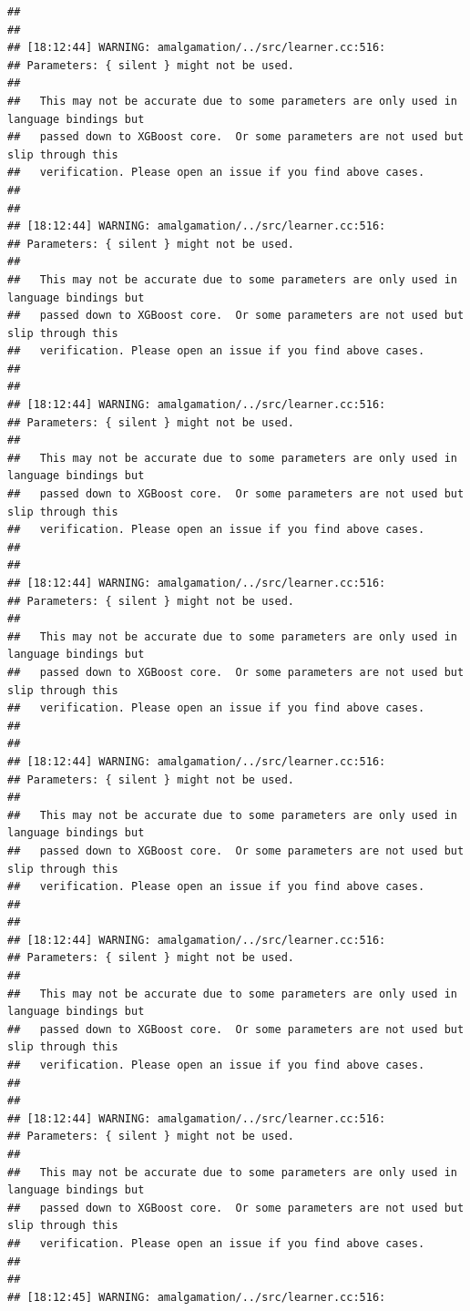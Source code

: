 \documentclass[AMS,STIX2COL]{WileyNJD-v2}\usepackage[]{graphicx}\usepackage[]{color}
\makeatletter
\newenvironment{kframe}{%
 \def\at@end@of@kframe{}%
 \ifinner\ifhmode%
  \def\at@end@of@kframe{\end{minipage}}%
  \begin{minipage}{\columnwidth}%
 \fi\fi%
 \def\FrameCommand##1{\hskip\@totalleftmargin \hskip-\fboxsep
 \colorbox{shadecolor}{##1}\hskip-\fboxsep
     \hskip-\linewidth \hskip-\@totalleftmargin \hskip\columnwidth}%
 \MakeFramed {\advance\hsize-\width
   \@totalleftmargin\z@ \linewidth\hsize
   \@setminipage}}%
 {\par\unskip\endMakeFramed%
 \at@end@of@kframe}
\newenvironment{knitrout}{}{} %
\makeatother
\begin{document}
\begin{knitrout}
\begin{kframe}
\begin{verbatim}
## 
## 
## [18:12:44] WARNING: amalgamation/../src/learner.cc:516: 
## Parameters: { silent } might not be used.
## 
##   This may not be accurate due to some parameters are only used in language bindings but
##   passed down to XGBoost core.  Or some parameters are not used but slip through this
##   verification. Please open an issue if you find above cases.
## 
## 
## [18:12:44] WARNING: amalgamation/../src/learner.cc:516: 
## Parameters: { silent } might not be used.
## 
##   This may not be accurate due to some parameters are only used in language bindings but
##   passed down to XGBoost core.  Or some parameters are not used but slip through this
##   verification. Please open an issue if you find above cases.
## 
## 
## [18:12:44] WARNING: amalgamation/../src/learner.cc:516: 
## Parameters: { silent } might not be used.
## 
##   This may not be accurate due to some parameters are only used in language bindings but
##   passed down to XGBoost core.  Or some parameters are not used but slip through this
##   verification. Please open an issue if you find above cases.
## 
## 
## [18:12:44] WARNING: amalgamation/../src/learner.cc:516: 
## Parameters: { silent } might not be used.
## 
##   This may not be accurate due to some parameters are only used in language bindings but
##   passed down to XGBoost core.  Or some parameters are not used but slip through this
##   verification. Please open an issue if you find above cases.
## 
## 
## [18:12:44] WARNING: amalgamation/../src/learner.cc:516: 
## Parameters: { silent } might not be used.
## 
##   This may not be accurate due to some parameters are only used in language bindings but
##   passed down to XGBoost core.  Or some parameters are not used but slip through this
##   verification. Please open an issue if you find above cases.
## 
## 
## [18:12:44] WARNING: amalgamation/../src/learner.cc:516: 
## Parameters: { silent } might not be used.
## 
##   This may not be accurate due to some parameters are only used in language bindings but
##   passed down to XGBoost core.  Or some parameters are not used but slip through this
##   verification. Please open an issue if you find above cases.
## 
## 
## [18:12:44] WARNING: amalgamation/../src/learner.cc:516: 
## Parameters: { silent } might not be used.
## 
##   This may not be accurate due to some parameters are only used in language bindings but
##   passed down to XGBoost core.  Or some parameters are not used but slip through this
##   verification. Please open an issue if you find above cases.
## 
## 
## [18:12:45] WARNING: amalgamation/../src/learner.cc:516: 

\end{verbatim}
\end{kframe}
\end{knitrout}
\end{document}
